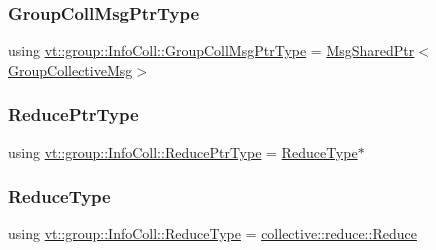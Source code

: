 \mbox{\label{structvt_1_1group_1_1_info_coll_a1fcdc451e1e99aedebf302b234c529a6}} 
\subsubsection{\texorpdfstring{Group\+Coll\+Msg\+Ptr\+Type}{GroupCollMsgPtrType}}
{\footnotesize\ttfamily using \hyperlink{structvt_1_1group_1_1_info_coll_a1fcdc451e1e99aedebf302b234c529a6}{vt\+::group\+::\+Info\+Coll\+::\+Group\+Coll\+Msg\+Ptr\+Type} =  \hyperlink{namespacevt_ab2b3d506ec8e8d1540aede826d84a239}{Msg\+Shared\+Ptr}$<$\hyperlink{namespacevt_1_1group_a4c1183efe0185992fefb3ab38a55a8a7}{Group\+Collective\+Msg}$>$}

\mbox{\label{structvt_1_1group_1_1_info_coll_a1b9fe0214f622ed9e8987531f44ef1fa}} 
\subsubsection{\texorpdfstring{Reduce\+Ptr\+Type}{ReducePtrType}}
{\footnotesize\ttfamily using \hyperlink{structvt_1_1group_1_1_info_coll_a1b9fe0214f622ed9e8987531f44ef1fa}{vt\+::group\+::\+Info\+Coll\+::\+Reduce\+Ptr\+Type} =  \hyperlink{structvt_1_1group_1_1_info_coll_a8376e2576e5e40b3c8059122bc96ec1b}{Reduce\+Type}$\ast$}

\mbox{\label{structvt_1_1group_1_1_info_coll_a8376e2576e5e40b3c8059122bc96ec1b}} 
\subsubsection{\texorpdfstring{Reduce\+Type}{ReduceType}}
{\footnotesize\ttfamily using \hyperlink{structvt_1_1group_1_1_info_coll_a8376e2576e5e40b3c8059122bc96ec1b}{vt\+::group\+::\+Info\+Coll\+::\+Reduce\+Type} =  \hyperlink{structvt_1_1collective_1_1reduce_1_1_reduce}{collective\+::reduce\+::\+Reduce}}



